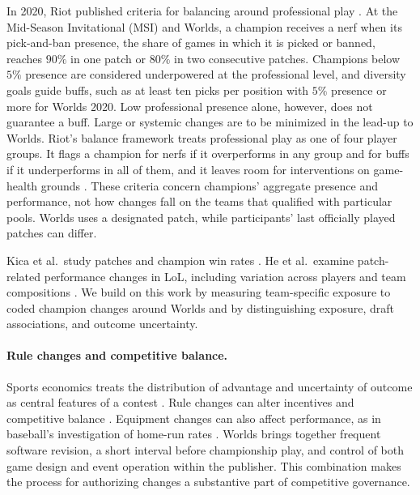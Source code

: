 \documentclass[11pt]{article}
\begin{document}
In 2020, Riot published criteria for balancing around professional play \citep{riot2020proplay}. At the Mid-Season Invitational (MSI) and Worlds, a champion receives a nerf when its pick-and-ban presence, the share of games in which it is picked or banned, reaches $90\%$ in one patch or $80\%$ in two consecutive patches. Champions below $5\%$ presence are considered underpowered at the professional level, and diversity goals guide buffs, such as at least ten picks per position with $5\%$ presence or more for Worlds 2020. Low professional presence alone, however, does not guarantee a buff. Large or systemic changes are to be minimized in the lead-up to Worlds. Riot's balance framework treats professional play as one of four player groups. It flags a champion for nerfs if it overperforms in any group and for buffs if it underperforms in all of them, and it leaves room for interventions on game-health grounds \citep{riot2020framework}. These criteria concern champions' aggregate presence and performance, not how changes fall on the teams that qualified with particular pools. Worlds uses a designated patch, while participants' last officially played patches can differ.

Kica et al.\ study patches and champion win rates \citep{kica2016}. He et al.\ examine patch-related performance changes in LoL, including variation across players and team compositions \citep{he2021}. We build on this work by measuring team-specific exposure to coded champion changes around Worlds and by distinguishing exposure, draft associations, and outcome uncertainty.

\paragraph{Rule changes and competitive balance.} Sports economics treats the distribution of advantage and uncertainty of outcome as central features of a contest \citep{rottenberg1956,neale1964,fort1995,szymanski2003}. Rule changes can alter incentives and competitive balance \citep{moschini2010,judde2013}. Equipment changes can also affect performance, as in baseball's investigation of home-run rates \citep{albert2018}. Worlds brings together frequent software revision, a short interval before championship play, and control of both game design and event operation within the publisher. This combination makes the process for authorizing changes a substantive part of competitive governance.
\end{document}
